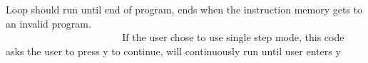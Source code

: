 Loop should run until end of program, ends when the instruction memory gets to an invalid program. ~\newline
~\newline
~\newline
~\newline
~\newline
~\newline
~\newline
~\newline
~\newline
~\newline
~\newline
~\newline
~\newline
~\newline
~\newline
~\newline
~\newline
~\newline
~\newline
~\newline
~\newline
~\newline
~\newline
~\newline
~\newline
~\newline
~\newline
~\newline
~\newline
~\newline
~\newline
~\newline
~\newline
~\newline
~\newline
~\newline
~\newline
~\newline
~\newline
~\newline
~\newline
~\newline
~\newline
~\newline
~\newline
~\newline
 If the user chose to use single step mode, this code asks the user to press y to continue, will continuously run until user enters y ~\newline
~\newline
